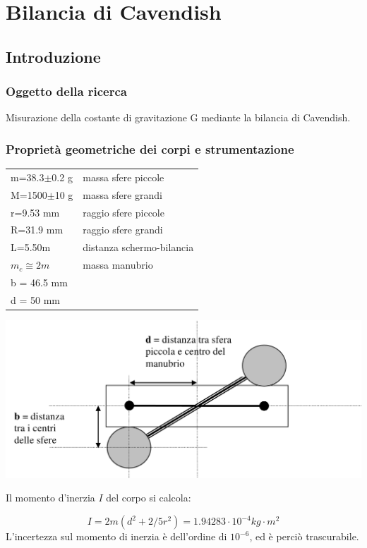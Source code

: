 \chapter{Bilancia di Cavendish}
\section{Introduzione}
\subsection{Oggetto della ricerca}
Misurazione della costante di gravitazione G mediante la bilancia di Cavendish.
\subsection{Proprietà geometriche dei corpi e strumentazione}

\begin{tabular}{ll}
m=38.3$\pm$0.2 g & massa sfere piccole\\
M=1500$\pm$10 g	 & massa sfere grandi\\
r=9.53 mm & raggio sfere piccole\\
R=31.9 mm & raggio sfere grandi\\
L=5.50m & distanza schermo-bilancia \\
$m_c\cong 2m$ & massa manubrio\\
b = 46.5 mm &\\
d = 50 mm &\\
\end{tabular}


\begin{center}
 \includegraphics[scale=0.25]{../grafici/cavendish/schema.png}
\end{center}

Il momento d'inerzia $I$ del corpo si calcola:

$$ I=2m(d^2+2/5r^2) = 1.94283 \cdot 10^{-4} kg\cdot m^2$$
L'incertezza sul momento di inerzia è dell'ordine di $10^{-6}$, ed è perciò trascurabile. 
